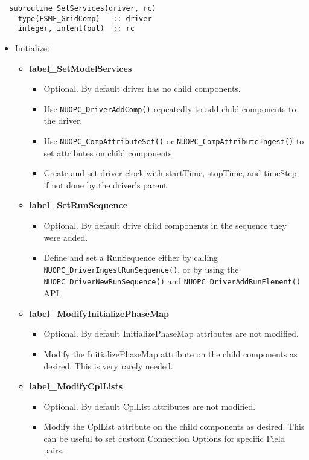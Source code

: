 \begin{verbatim}  subroutine SetServices(driver, rc)
    type(ESMF_GridComp)   :: driver
    integer, intent(out)  :: rc
\end{verbatim}

\begin{itemize}
  \item Initialize:
  \begin{itemize}
    \item {\bf label\_SetModelServices}
    \begin{itemize}
      \item Optional. By default driver has no child components.
      \item Use {\tt NUOPC\_DriverAddComp()} repeatedly to add child components to the driver.
      \item Use {\tt NUOPC\_CompAttributeSet()} or {\tt NUOPC\_CompAttributeIngest()} to set attributes on child components.
      \item Create and set driver clock with startTime, stopTime, and timeStep, if not done by the driver's parent.
    \end{itemize}
    \item {\bf label\_SetRunSequence}
    \begin{itemize}
      \item Optional. By default drive child components in the sequence they were added.
      \item Define and set a RunSequence either by calling {\tt NUOPC\_DriverIngestRunSequence()}, or by using the {\tt NUOPC\_DriverNewRunSequence()} and {\tt NUOPC\_DriverAddRunElement()} API.
    \end{itemize}
    \item {\bf label\_ModifyInitializePhaseMap}
    \begin{itemize}
      \item Optional. By default InitializePhaseMap attributes are not modified.
      \item Modify the InitializePhaseMap attribute on the child components as desired. This is very rarely needed.
    \end{itemize}
    \item {\bf label\_ModifyCplLists}
    \begin{itemize}
      \item Optional. By default CplList attributes are  not modified.
      \item Modify the CplList attribute on the child components as desired. This can be useful to set custom Connection Options for specific Field pairs.

\end{itemize}
\end{itemize}
\end{itemize}
